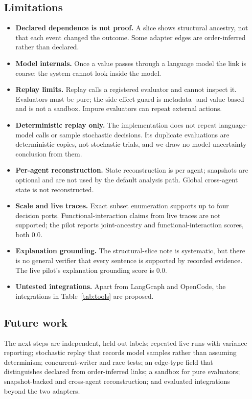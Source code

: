 \documentclass[11pt]{article}
\begin{document}
\subsection{Limitations}
\begin{itemize}
\item \textbf{Declared dependence is not proof.} A slice shows structural ancestry, not that each event changed the outcome. Some adapter edges are order-inferred rather than declared.
\item \textbf{Model internals.} Once a value passes through a language model the link is coarse; the system cannot look inside the model.
\item \textbf{Replay limits.} Replay calls a registered evaluator and cannot inspect it. Evaluators must be pure; the side-effect guard is metadata- and value-based and is not a sandbox. Impure evaluators can repeat external actions.
\item \textbf{Deterministic replay only.} The implementation does not repeat language-model calls or sample stochastic decisions. Its duplicate evaluations are deterministic copies, not stochastic trials, and we draw no model-uncertainty conclusion from them.
\item \textbf{Per-agent reconstruction.} State reconstruction is per agent; snapshots are optional and are not used by the default analysis path. Global cross-agent state is not reconstructed.
\item \textbf{Scale and live traces.} Exact subset enumeration supports up to four decision ports. Functional-interaction claims from live traces are not supported; the pilot reports joint-ancestry and functional-interaction scores, both 0.0.
\item \textbf{Explanation grounding.} The structural-slice note is systematic, but there is no general verifier that every sentence is supported by recorded evidence. The live pilot's explanation grounding score is 0.0.
\item \textbf{Untested integrations.} Apart from LangGraph and OpenCode, the integrations in Table~\ref{tab:tools} are proposed.
\end{itemize}

\subsection{Future work}
The next steps are independent, held-out labels; repeated live runs with variance reporting; stochastic replay that records model samples rather than assuming determinism; concurrent-writer and race tests; an edge-type field that distinguishes declared from order-inferred links; a sandbox for pure evaluators; snapshot-backed and cross-agent reconstruction; and evaluated integrations beyond the two adapters.
\end{document}
